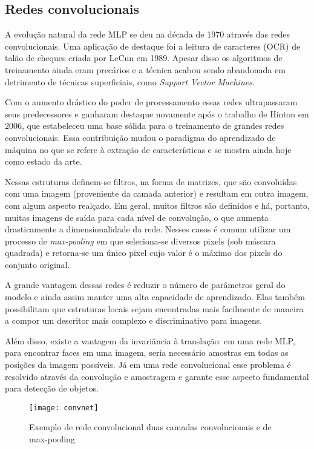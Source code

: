 \subsection{Redes convolucionais}
A evolução natural da rede MLP se deu na década de 1970 através das redes convolucionais. Uma aplicação de destaque foi a leitura de caracteres (OCR) de talão de cheques criada por LeCun em 1989. Apesar disso os algoritmos de treinamento ainda eram precários e a técnica acabou sendo abandonada em detrimento de técnicas superficiais, como \textit{Support Vector Machines}.

Com o aumento drástico do poder de processamento essas redes ultrapassaram seus predecessores e ganharam destaque novamente após o trabalho de Hinton \cite{hintonDL} em 2006, que estabeleceu uma base sólida para o treinamento de grandes redes convolucionais. Essa contribuição mudou o paradigma do aprendizado de máquina no que se refere à extração de características e se mostra ainda hoje como estado da arte. 

Nessas estruturas definem-se filtros, na forma de matrizes, que são convoluídas com uma imagem (proveniente da camada anterior) e resultam em outra imagem, com algum aspecto realçado. Em geral, muitos filtros são definidos e há, portanto, muitas imagens de saída para cada nível de convolução, o que aumenta drasticamente a dimensionalidade da rede. Nesses casos é comum utilizar um processo de \textit{max-pooling} em que seleciona-se diversos pixels (sob máscara quadrada) e retorna-se um único pixel cujo valor é o máximo dos pixels do conjunto original.

A grande vantagem dessas redes é reduzir o número de parâmetros geral do modelo e ainda assim manter uma alta capacidade de aprendizado. Elas também possibilitam que estruturas locais sejam encontradas mais facilmente de maneira a compor um descritor mais complexo e discriminativo para imagens.

Além disso, existe a vantagem da invariância à translação: em uma rede MLP, para encontrar faces em uma imagem, seria necessário amostras em todas as posições da imagem possíveis. Já em uma rede convolucional esse problema é resolvido através da convolução e amostragem e garante esse aspecto fundamental para detecção de objetos.

\begin{figure}[h]
\centering
\texttt{[image: convnet]}
\caption{Exemplo de rede convolucional duas camadas convolucionais e de max-pooling}
\label{fig:convnet}
\end{figure}

